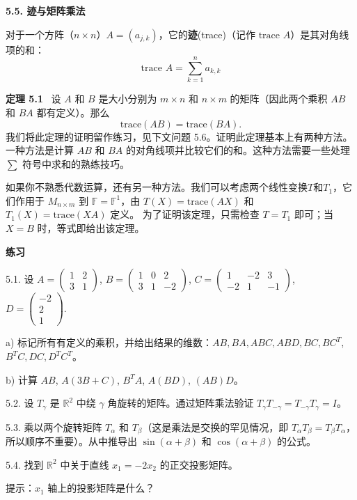 \textbf{5.5. 迹与矩阵乘法}

对于一个方阵（$n \times n$）$A = (a_{j,k})$，它的\textbf{迹}(trace)（记作 $\text{trace } A$）是其对角线项的和：
$$
\text{trace } A = \sum_{k=1}^n a_{k,k}
$$

\textbf{定理 5.1} ~设 $A$ 和 $B$ 是大小分别为 $m \times n$ 和 $n \times m$ 的矩阵（因此两个乘积 $AB$ 和 $BA$ 都有定义）。那么
$$
\text{trace}(AB) = \text{trace}(BA).
$$
我们将此定理的证明留作练习，见下文问题 5.6。证明此定理基本上有两种方法。一种方法是计算 $AB$ 和 $BA$ 的对角线项并比较它们的和。这种方法需要一些处理 $\sum$ 符号中求和的熟练技巧。

如果你不熟悉代数运算，还有另一种方法。我们可以考虑两个线性变换$T$和$T_1$，它们作用于 $M_{n \times m}$ 到 $\mathbb{F} = \mathbb{F}^1$，由 
$T(X) = \text{trace}(AX)$ 和 $T_1(X) = \text{trace}(XA)$
定义。
为了证明该定理，只需检查 $T=T_1$ 即可；当 $X=B$ 时，等式即给出该定理。

\textbf{练习}~

5.1. 设 $A = \begin{pmatrix} 1 & 2 \\ 3 & 1 \end{pmatrix}$, $B = \begin{pmatrix} 1 & 0 & 2 \\ 3 & 1 & -2 \end{pmatrix}$, $C = \begin{pmatrix} 1 & -2 & 3 \\ -2 & 1 & -1 \end{pmatrix}$, $D = \begin{pmatrix} -2 \\ 2 \\ 1 \end{pmatrix}.$

a) 标记所有有定义的乘积，并给出结果的维数：$AB, BA, ABC, ABD, BC, BC^T$, $B^T C, DC, D^T C^T$。

b) 计算 $AB$, $A(3B + C)$, $B^T A$, $A(BD)$, $(AB)D$。

5.2. 设 $T_\gamma$ 是 $\mathbb{R}^2$ 中绕 $\gamma$ 角旋转的矩阵。通过矩阵乘法验证 $T_\gamma T_{-\gamma} = T_{-\gamma} T_\gamma = I$。

5.3. 乘以两个旋转矩阵 $T_\alpha$ 和 $T_\beta$（这是乘法是交换的罕见情况，即 $T_\alpha T_\beta = T_\beta T_\alpha$，所以顺序不重要）。从中推导出 $\sin(\alpha + \beta)$ 和 $\cos(\alpha + \beta)$ 的公式。

5.4. 找到 $\mathbb{R}^2$ 中关于直线 $x_1 = -2x_2$ 的正交投影矩阵。

提示：$x_1$ 轴上的投影矩阵是什么？

